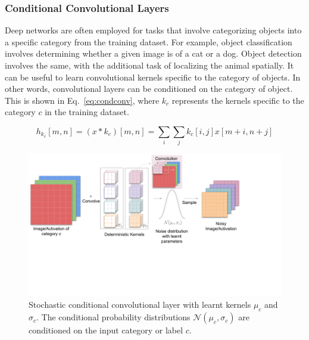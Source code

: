 \documentclass[12pt, letterpaper]{article}
\begin{document}
\subsubsection{Conditional Convolutional Layers}
\label{sec:condconv}
Deep networks are often employed for tasks that involve categorizing objects into a specific category from the training dataset. For example, object classification involves determining whether a given image is of a cat or a dog. Object detection involves the same, with the additional task of localizing the animal spatially. It can be useful to learn convolutional kernels specific to the category of objects. In other words, convolutional layers can be conditioned on the category of object. This is shown in Eq.~\eqref{eq:condconv}, where $k_c$ represents the kernels specific to the category $c$ in the training dataset.

\begin{equation}
  h_{k_c}[m,n]=(x * k_c)[m,n]=\sum_i \sum_j k_c[i,j]x[m+i,n+j]
  \label{eq:condconv}
\end{equation}
\begin{figure}[t]
    \centering
    \includegraphics[width=\textwidth, trim={0 5cm 2.5cm 0}, clip]{Conditional noise layer.pdf}
    \caption{Stochastic conditional convolutional layer with learnt kernels $\mu_c$ and $\sigma_c$. The conditional probability distributions $\mathcal{N}(\mu_c, \sigma_c)$ are conditioned on the input category or label $c$.}
    \label{fig:condconv}
\end{figure}
\end{document}
